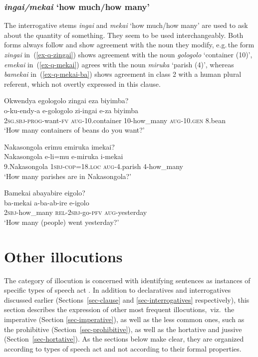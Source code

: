 \subsubsection{\emph{ingai/mekai} `how much/how many'} 

The interrogative stems \emph{ingai} and \emph{mekai} ‘how much/how many' are used to ask about the quantity of something. 
They seem to be used interchangeably. 
Both forms always follow and show agreement with the noun they modify, e.g.\,the form \emph{zingai} in~(\ref{ex-q-zingai}) shows agreement with the noun \emph{gologolo} `container  (10)', \emph{emekai} in~(\ref{ex-q-mekai}) agrees with the noun \emph{miruka} `parish (4)', whereas \emph{bamekai} in~(\ref{ex-q-mekai-ba}) shows agreement in class 2 with a human plural referent, which not overtly expressed in this clause.

\ea \label{ex-q-ingai}
\begin{xlist}

\ex \label{ex-q-zingai}
	\glll Okwendya egologolo zingai eza biyimba?\\
		o-ku-endy-a 	e-gologolo zi-ingai e-za biyimba\\
		2\textsc{sg.sbj}-\textsc{prog}-want-\textsc{fv} \textsc{aug}-10.container 10-how\_many \textsc{aug}-10.\textsc{gen} 8.bean\\
	\glt	`How many containers of beans do you want?'
	
\ex \label{ex-q-mekai}
	\glll Nakasongola erimu emiruka imekai? \\
	 Nakasongola e-li=mu e-miruka i-mekai\\
		9.Nakasongola \textsc{1sbj}-\textsc{cop}=18.\textsc{loc} \textsc{aug}-4.parish 4-how\_many\\
	\glt `How many parishes are in Nakasongola?’
	
\ex \label{ex-q-mekai-ba}
	\glll Bamekai abayabire eigolo?\\
		ba-mekai a-ba-ab-ire e-igolo\\
		\textsc{2sbj}-how\_many \textsc{rel}-\textsc{2sbj}-go-\textsc{pfv} \textsc{aug}-yesterday\\
	\glt	`How many (people) went yesterday?'
\end{xlist}
\z


\section{Other illocutions}\label{sec-syntax-illocutions}

The category of illocution is concerned with identifying sentences as instances of specific types of speech act \citet[1190]{Hengeveld2004Illocution}. 
In addition to declaratives and interrogatives discussed earlier (Sections~\ref{sec-clause} and \ref{sec-interrogatives} respectively), this section describes the expression of other most frequent illocutions, viz.\, the imperative (Section \ref{sec-imperative}), as well as the less common ones, such as the prohibitive (Section~\ref{sec-prohibitive}), as well as the hortative and jussive (Section~\ref{sec-hortative}). 
As the sections below make clear, they are organized according to types of speech act and not according to their formal properties.


